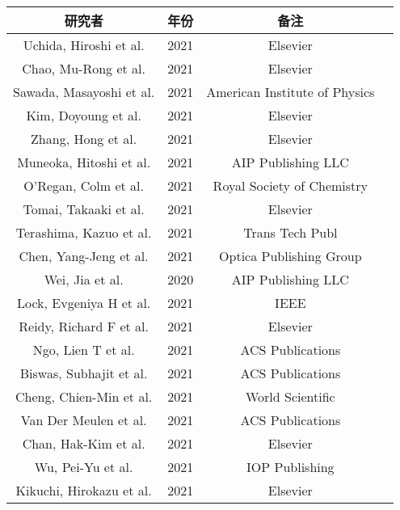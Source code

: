 \begin{center}
\begin{tabular}{cccc}
\hline
研究者 & 年份 & 备注 \\
\hline
Uchida, Hiroshi et al. \cite{uchida2012solubility} & 2021 & Elsevier \\
Chao, Mu-Rong et al. \cite{chao2009efficient} & 2021 & Elsevier \\
Sawada, Masayoshi et al. \cite{sawada2006micrometer} & 2021 & American Institute of Physics \\
Kim, Doyoung et al. \cite{kim2013ru} & 2021 & Elsevier \\
Zhang, Hong et al. \cite{zhang2020low} & 2021 & Elsevier \\
Muneoka, Hitoshi et al. \cite{stauss2015review} & 2021 & AIP Publishing LLC \\
O'Regan, Colm et al. \cite{o2014recent} & 2021 & Royal Society of Chemistry \\
Tomai, Takaaki et al. \cite{tomai2007carbon} & 2021 & Elsevier \\
Terashima, Kazuo et al. \cite{terashima2006microplasma} & 2021 & Trans Tech Publ \\
Chen, Yang-Jeng et al. \cite{chen2018supercritical} & 2021 & Optica Publishing Group \\
Wei, Jia et al. \cite{wei2020investigation} & 2020 & AIP Publishing LLC \\
Lock, Evgeniya H et al. \cite{lock2009influence} & 2021 & IEEE \\
Reidy, Richard F et al. \cite{reidy2018cryogenic} & 2021 & Elsevier \\
Ngo, Lien T et al. \cite{ngo2006ultimate} & 2021 & ACS Publications \\
Biswas, Subhajit et al. \cite{biswas2021stretching} & 2021 & ACS Publications \\
Cheng, Chien-Min et al. \cite{cheng2012improvement} & 2021 & World Scientific \\
Van Der Meulen et al. \cite{van2009single} & 2021 & ACS Publications \\
Chan, Hak-Kim et al. \cite{chan2011production} & 2021 & Elsevier \\
Wu, Pei-Yu et al. \cite{wu2021enhancing} & 2021 & IOP Publishing \\
Kikuchi, Hirokazu et al. \cite{kikuchi2008cu} & 2021 & Elsevier \\
\hline
\end{tabular}
\end{center}


